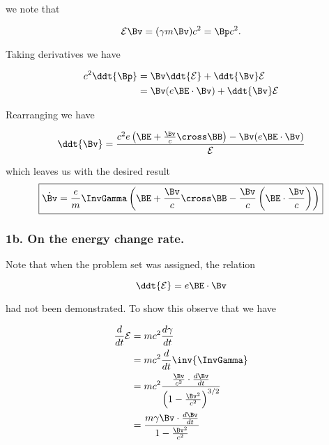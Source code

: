 we note that

\begin{equation}\label{eqn:relElectroDynProblemSet2:170}
\mathcal{E}\Bv = (\gamma m \Bv) c^2 = \Bp c^2.
\end{equation}

Taking derivatives we have

\begin{align*}
c^2 \ddt{\Bp} 
&= \Bv \ddt{\mathcal{E}} + \ddt{\Bv} \mathcal{E} \\
&= \Bv (e \BE \cdot \Bv) + \ddt{\Bv} \mathcal{E} \\
\end{align*}

Rearranging we have

\begin{equation}\label{eqn:relElectroDynProblemSet2:190}
\ddt{\Bv}
=
\frac{c^2 e \left( \BE + \frac{\Bv}{c} \cross \BB \right) - \Bv (e \BE \cdot \Bv) }{ \mathcal{E} } 
\end{equation}

which leaves us with the desired result
\begin{equation}\label{eqn:relElectroDynProblemSet2:210}
\boxed{
\dot{\Bv} =
\frac{e}{m} \InvGamma \left( \BE + \frac{\Bv}{c} \cross \BB - \frac{\Bv}{c} \left(\BE \cdot \frac{\Bv}{c} \right) \right)
}
\end{equation}

\subsubsection{1b.  On the energy change rate.}

Note that when the problem set was assigned, the relation

\begin{equation}\label{eqn:relElectroDynProblemSet2:230}
\ddt{\mathcal{E}} = e \BE \cdot \Bv
\end{equation}

had not been demonstrated.  To show this observe that we have

\begin{align*}
\frac{d}{dt} \mathcal{E}
&= m c^2 \frac{d\gamma}{dt} \\
&= m c^2 \frac{d}{dt} \inv{\InvGamma} \\
&= m c^2 \frac{\frac{\Bv}{c^2} \cdot \frac{d\Bv}{dt}}{\left(1 - \frac{\Bv^2}{c^2}\right)^{3/2}} \\
&= \frac{m \gamma \Bv \cdot \frac{d\Bv}{dt}}{1 - \frac{\Bv^2}{c^2}}
\end{align*}

